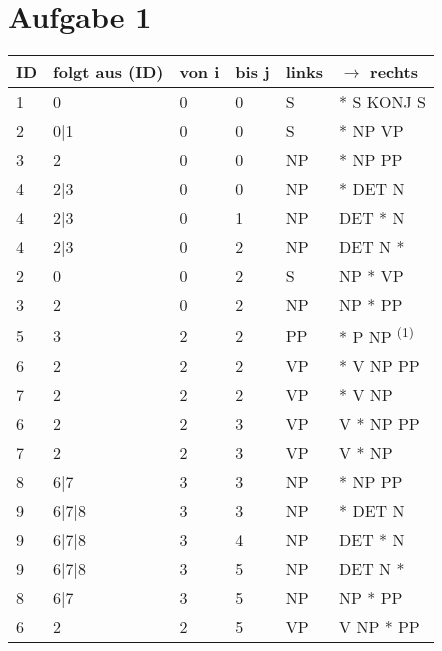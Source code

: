 \documentclass[a4paper]{sprach}
\begin{document}

\tableofcontents

\section*{Aufgabe 1}


\begin{table}[h]
    \centering
    \begin{tabular}{llllll}
    \hline
     ID & folgt aus (ID) & von i & bis j & links & $\rightarrow$ rechts     \\ \hline
    1   & 0              & 0     & 0     & S     & * S KONJ S \\
    2   & 0|1            & 0     & 0     & S     & * NP VP    \\
    3   & 2              & 0     & 0     & NP    & * NP PP    \\
    4   & 2|3            & 0     & 0     & NP    & * DET N    \\
    4   & 2|3            & 0     & 1     & NP    & DET * N    \\
    4   & 2|3            & 0     & 2     & NP    & DET N *    \\
    2   & 0              & 0     & 2     & S     & NP * VP    \\
    3   & 2              & 0     & 2     & NP    & NP * PP    \\
    5   & 3              & 2     & 2     & PP    & * P NP \textsuperscript{(1)}\\
    6   & 2              & 2     & 2     & VP    & * V NP PP  \\
    7   & 2              & 2     & 2     & VP    & * V NP     \\
    6   & 2              & 2     & 3     & VP    & V * NP PP  \\
    7   & 2              & 2     & 3     & VP    & V * NP     \\
    8   & 6|7            & 3     & 3     & NP    & * NP PP    \\
    9   & 6|7|8          & 3     & 3     & NP    & * DET N    \\
    9   & 6|7|8          & 3     & 4     & NP    & DET * N    \\
    9   & 6|7|8          & 3     & 5     & NP    & DET N *    \\
    8   & 6|7            & 3     & 5     & NP    & NP * PP    \\
    6   & 2              & 2     & 5     & VP    & V NP * PP  \\

\end{tabular}
\end{table}
\end{document}
